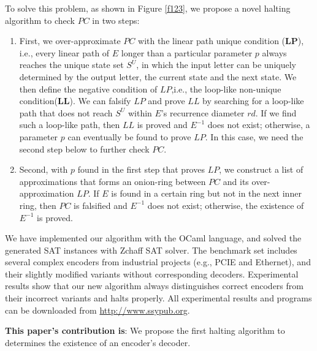 \documentclass[journal]{IEEEtran}
\begin{document}
To solve this problem,
as shown in Figure \ref{f123},
we propose a novel halting algorithm to check $PC$ in two steps:
\begin{enumerate}
\item First,
we over-approximate $PC$ with the linear path unique condition ($\boldsymbol{LP}$),
i.e.,
every linear path of $E$ longer than a particular parameter $p$ always reaches the unique state set $S^U$,
in which the input letter can be uniquely determined by the output letter, the current state and the next state.
We then define the negative condition of $LP$,i.e.,
the loop-like non-unique condition($\boldsymbol{LL}$).
We can falsify $LP$ and prove $LL$ by searching for a loop-like path that does not reach $S^U$ within $E$'s recurrence diameter $rd$.
If we find such a loop-like path,
then $LL$ is proved and $E^{-1}$ does not exist;
otherwise,
a parameter $p$ can eventually be found to prove $LP$.
In this case,
we need the second step below to further check $PC$.
\item Second,
with $p$ found in the first step that proves $LP$,
we construct a list of approximations that forms an onion-ring between $PC$ and its over-approximation $LP$.
If $E$ is found in a certain ring but not in the next inner ring,
then $PC$ is falsified and $E^{-1}$ does not exist;
otherwise,
the existence of $E^{-1}$ is proved.
\end{enumerate}

We have implemented our algorithm with the OCaml language,
and solved the generated SAT instances with Zchaff SAT solver\cite{CHAFF}.
The benchmark set includes several complex encoders from industrial projects
(e.g.,
PCIE and Ethernet),
and their slightly modified variants without corresponding decoders.
Experimental results show that
our new algorithm always distinguishes correct encoders from their incorrect variants and halts properly.
All experimental results and programs can be downloaded from \url{http://www.ssypub.org}.

\textbf{This paper's contribution is}:
We propose the first halting algorithm to determines the existence of an encoder's decoder.
\end{document}
